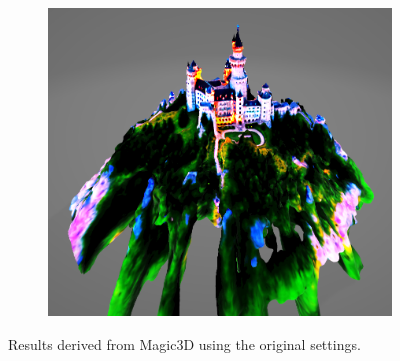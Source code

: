 \begin{figure}[ht]
\begin{subfigure}[b]{0.187\textwidth}
        \caption{}
    \end{subfigure}
    \begin{subfigure}[b]{0.5\textwidth}
        \centering
        \includegraphics[width=\textwidth]{etc/Original/magic3D_schloss_neuschwanstein.PNG}
        \caption{}
    \end{subfigure}
    \caption{Results derived from Magic3D \citep{lin2023magic3d} using the original settings.}\label{fig:magic3DOriginal}
\end{figure}



